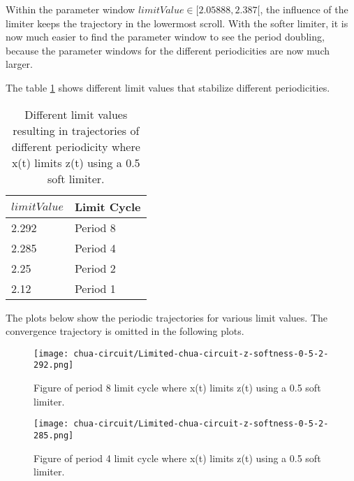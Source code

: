 \documentclass[main]{subfiles}
\begin{document}
Within the parameter window \(limitValue \in [2.05888,2.387[\), the influence of the limiter keeps the trajectory in the lowermost scroll. %
%
With the softer limiter, it is now much easier to find the parameter window to see the period doubling, because the parameter windows for the different periodicities are now much larger. 

The table \ref{table:z-0.5-periodicities} shows different limit values that stabilize different periodicities.

\begin{table}[H]
\renewcommand{\arraystretch}{1.2}
\center
\begin{tabular}{@{}ll@{}}
	\toprule
   \(limitValue\) & Limit Cycle\\
   \midrule
   2.292 & Period 8 \\ 
   2.285 & Period 4 \\
   2.25  & Period 2 \\
   2.12 & Period 1 \\
   \bottomrule
\end{tabular}
\caption[Periodicity control limit values (x(t) limiting z(t) with softness 0.5)]{Different limit values resulting in trajectories of different periodicity where x(t) limits z(t) using a 0.5 soft limiter.}
\label{table:z-0.5-periodicities}
\end{table}

The plots below show the periodic trajectories for various limit values. The convergence trajectory is omitted in the following plots.


\begin{figure}[H]
\centering
\texttt{[image: chua-circuit/Limited-chua-circuit-z-softness-0-5-2-292.png]}
\caption[Figure of period 8 limit cycle using a 0.5 soft limiter.]{Figure of period 8 limit cycle where x(t) limits z(t) using a 0.5 soft limiter.}
\label{figure:z-0.5-8-limit-cycle-trajectory}
\end{figure}

\begin{figure}[H]
\centering
\texttt{[image: chua-circuit/Limited-chua-circuit-z-softness-0-5-2-285.png]}
\caption[Figure of period 4 limit cycle using a 0.5 soft limiter.]{Figure of period 4 limit cycle where x(t) limits z(t) using a 0.5 soft limiter.}
\label{figure:z-0.5-4-limit-cycle-trajectory}
\end{figure}
\end{document}
